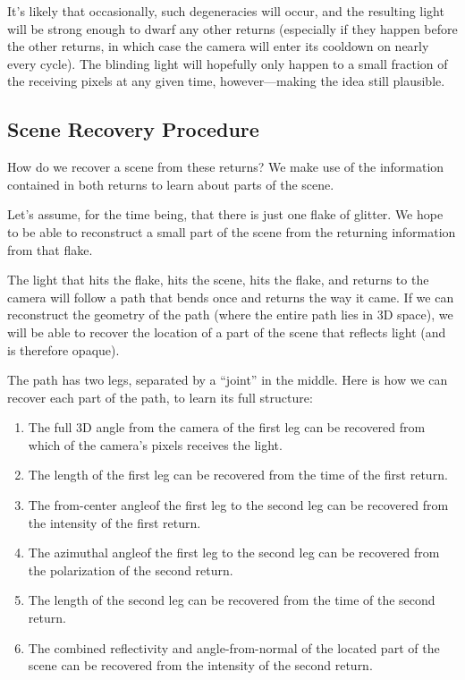 \documentclass[11pt]{article}
\begin{document}
It's likely that occasionally, such degeneracies will occur, and the resulting light will be strong enough to dwarf any other returns (especially if they happen before the other returns, in which case the camera will enter its cooldown on nearly every cycle). The blinding light will hopefully only happen to a small fraction of the receiving pixels at any given time, however---making the idea still plausible.

\subsection{Scene Recovery Procedure}

How do we recover a scene from these returns? We make use of the information contained in both returns to learn about parts of the scene.

Let's assume, for the time being, that there is just one flake of glitter. We hope to be able to reconstruct a small part of the scene from the returning information from that flake. 

The light that hits the flake, hits the scene, hits the flake, and returns to the camera will follow a path that bends once and returns the way it came. If we can reconstruct the geometry of the path (where the entire path lies in 3D space), we will be able to recover the location of a part of the scene that reflects light (and is therefore opaque).

The path has two legs, separated by a ``joint'' in the middle. Here is how we can recover each part of the path, to learn its full structure:

\begin{enumerate}
    \item The full 3D angle from the camera of the first leg can be recovered from which of the camera's pixels receives the light.
    \item The length of the first leg can be recovered from the time of the first return.
    \item The from-center angle\footnotemark of the first leg to the second leg can be recovered from the intensity of the first return.
    \item The azimuthal angle\footnotemark of the first leg to the second leg can be recovered from the polarization of the second return.
    \item The length of the second leg can be recovered from the time of the second return.
    \item The combined reflectivity and angle-from-normal of the located part of the scene can be recovered from the intensity of the second return.
\end{enumerate}
\end{document}
